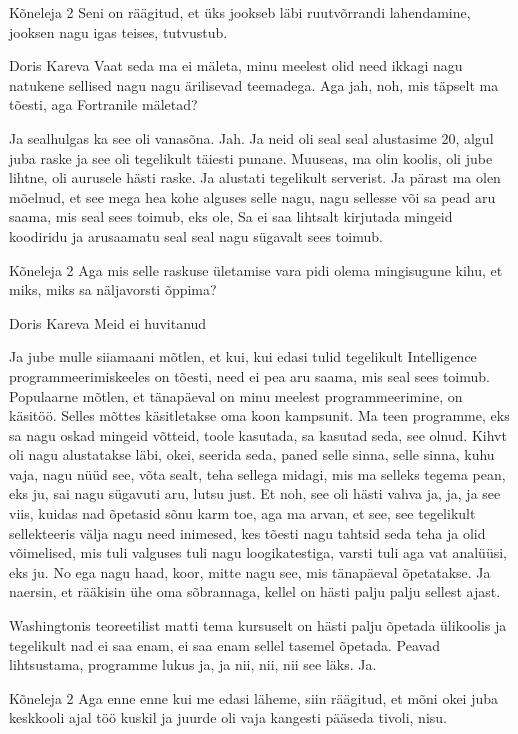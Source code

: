 Kõneleja 2
Seni on räägitud, et üks jookseb läbi ruutvõrrandi lahendamine, jooksen nagu igas teises, tutvustub. 

Doris Kareva
Vaat seda ma ei mäleta, minu meelest olid need ikkagi nagu natukene sellised nagu nagu ärilisevad teemadega. Aga jah, noh, mis täpselt ma tõesti, aga Fortranile mäletad? 

Ja sealhulgas ka see oli vanasõna. Jah. Ja neid oli seal seal alustasime 20, algul juba raske ja see oli tegelikult täiesti punane. Muuseas, ma olin koolis, oli jube lihtne, oli aurusele hästi raske. Ja alustati tegelikult serverist. Ja pärast ma olen mõelnud, et see mega hea kohe alguses selle nagu, nagu sellesse või sa pead aru saama, mis seal sees toimub, eks ole, Sa ei saa lihtsalt kirjutada mingeid koodiridu ja arusaamatu seal seal nagu sügavalt sees toimub. 

Kõneleja 2
Aga mis selle raskuse ületamise vara pidi olema mingisugune kihu, et miks, miks sa näljavorsti õppima? 

Doris Kareva
Meid ei huvitanud 

Ja jube mulle siiamaani mõtlen, et kui, kui edasi tulid tegelikult Intelligence programmeerimiskeeles on tõesti, need ei pea aru saama, mis seal sees toimub. Populaarne mõtlen, et tänapäeval on minu meelest programmeerimine, on käsitöö. Selles mõttes käsitletakse oma koon kampsunit. Ma teen programme, eks sa nagu oskad mingeid võtteid, toole kasutada, sa kasutad seda, see olnud. Kihvt oli nagu alustatakse läbi, okei, seerida seda, paned selle sinna, selle sinna, kuhu vaja, nagu nüüd see, võta sealt, teha sellega midagi, mis ma selleks tegema pean, eks ju, sai nagu sügavuti aru, lutsu just. Et noh, see oli hästi vahva ja, ja, ja see viis, kuidas nad õpetasid sõnu karm toe, aga ma arvan, et see, see tegelikult sellekteeris välja nagu need inimesed, kes tõesti nagu tahtsid seda teha ja olid võimelised, mis tuli valguses tuli nagu loogikatestiga, varsti tuli aga vat analüüsi, eks ju. No ega nagu haad, koor, mitte nagu see, mis tänapäeval õpetatakse. Ja naersin, et rääkisin ühe oma sõbrannaga, kellel on hästi palju palju sellest ajast. 

Washingtonis teoreetilist matti tema kursuselt on hästi palju õpetada ülikoolis ja tegelikult nad ei saa enam, ei saa enam sellel tasemel õpetada. Peavad lihtsustama, programme lukus ja, ja nii, nii, nii see läks. Ja. 

Kõneleja 2
Aga enne enne kui me edasi läheme, siin räägitud, et mõni okei juba keskkooli ajal töö kuskil ja juurde oli vaja kangesti pääseda tivoli, nisu. 

